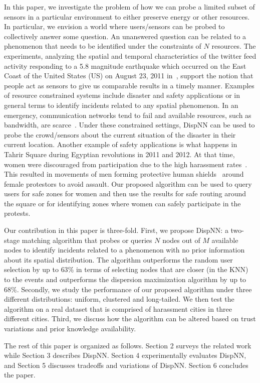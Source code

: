 \documentclass{acm_proc_article-sp}
\begin{document}
In this paper, we investigate the problem of how we can probe a limited subset of sensors in a particular environment to either preserve energy or other resources. In particular, we envision a world where users/sensors can be probed to collectively answer some question. An unanswered question can be related to a phenomenon that needs to be identified under the constraints of $N$ resources. The experiments, analyzing the spatial and temporal characteristics of the twitter feed activity responding to a 5.8 magnitude earthquake which occurred on the East Coast of the United States (US) on August 23, 2011 in~\cite{crooks2013earthquake}, support the notion that people act as sensors to give us comparable results in a timely manner. Examples of resource constrained systems include disaster and safety applications or in general terms to identify incidents related to any spatial phenomenon. In an emergency, communication networks tend to fail and available resources, such as bandwidth, are scarce~\cite{manoj2007communication}. Under these constrained settings, DispNN can be used to probe the crowd/sensors about the current situation of the disaster in their current location. Another example of safety applications is what happens in Tahrir Square during Egyptian revolutions in 2011 and 2012. At that time, women were discouraged from participation due to the high harassment rates~\cite{guardianSH}. This resulted in movements of men forming protective human shields~\cite{worldPostHS} around female protestors to avoid assault. Our proposed algorithm can be used to query users for safe zones for women and then use the results for safe routing around the square or for identifying zones where women can safely participate in the protests. \par
Our contribution in this paper is three-fold. First, we propose DispNN: a two-stage matching algorithm that probes or queries $N$ nodes out of $M$ available nodes to identify incidents related to a phenomenon with no prior information about its spatial distribution. The algorithm outperforms the random user selection by up to $63\%$ in terms of selecting nodes that are closer (in the KNN) to the events and outperforms the dispersion maximization algorithm by up to $68\%$. Secondly, we study the performance of our proposed algorithm under three different distributions: uniform, clustered and long-tailed. We then test the algorithm on a real dataset that is comprised of harassment cities in three different cities. Third, we discuss how the algorithm can be altered based on trust variations and prior knowledge availability.\par
The rest of this paper is organized as follows. Section 2 surveys the related work while Section 3 describes DispNN. Section 4 experimentally evaluates DispNN, and Section 5 discusses tradeoffs and variations of DispNN. Section 6 concludes the paper.
\end{document}

